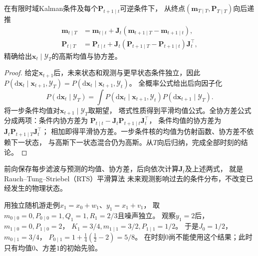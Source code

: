 \begin{theorem}[有限时域RTS平滑]
 \label{thm:dynamical-rts-smoother}
 在有限时域Kalman条件及每个$\bm P_{t+1\mid t}$可逆条件下，
 从终点$(\bm m_{T\mid T},\bm P_{T\mid T})$向后递推
 \begin{align}
  \bm m_{t\mid T}
   &=\bm m_{t\mid t}+\bm J_t(\bm m_{t+1\mid T}-\bm m_{t+1\mid t}),
       \label{eq:dynamical-rts-smoothed-mean}\\
  \bm P_{t\mid T}
   &=\bm P_{t\mid t}
         +\bm J_t(\bm P_{t+1\mid T}-\bm P_{t+1\mid t})\bm J_t^\top,
       \label{eq:dynamical-rts-smoothed-covariance}
 \end{align}
 精确给出$\bm x_t\mid\mathcal Y_T$的高斯均值与协方差。
\end{theorem}
\begin{proof}
 给定$\bm x_{t+1}$后，未来状态和观测与更早状态条件独立，因此
 $P(\mathrm d\bm x_t\mid\bm x_{t+1},\mathcal Y_T)
   =P(\mathrm d\bm x_t\mid\bm x_{t+1},\mathcal Y_t)$。
 全概率公式给出后向因子化
 \begin{equation}
  P(\mathrm d\bm x_t\mid\mathcal Y_T)
   =\int P(\mathrm d\bm x_t\mid\bm x_{t+1},\mathcal Y_t)
                   P(\mathrm d\bm x_{t+1}\mid\mathcal Y_T).
  \label{eq:dynamical-rts-backward-factorization}
 \end{equation}
 将一步条件均值对$\bm x_{t+1}\mid\mathcal Y_T$取期望，
 塔式性质得到平滑均值公式。全协方差公式分成两项：条件内协方差为
 $\bm P_{t\mid t}-\bm J_t\bm P_{t+1\mid t}\bm J_t^\top$，
 条件均值的协方差为$\bm J_t\bm P_{t+1\mid T}\bm J_t^\top$；
 相加即得平滑协方差。一步条件核的均值为仿射函数、协方差不依赖下一状态，
 与高斯下一状态混合仍为高斯。从$T$向后归纳，完成全部时刻的结论。
\end{proof}

前向保存每步滤波与预测的均值、协方差，后向依次计算$\bm J_t$及上述两式，
就是Rauch--Tung--Striebel（RTS）平滑算法
未来观测影响过去的条件分布，不改变已经发生的物理状态。

\begin{example}[未来观测降低过去状态的不确定性]
 \label{ex:dynamical-scalar-rts-update}
 用独立随机游走例$x_1=x_0+w_1$、$y_1=x_1+v_1$，
 取$m_{0\mid0}=0,P_{0\mid0}=1,Q_1=1,R_1=2/3$且噪声独立。
 观察$y_1=2$后，$m_{1\mid0}=0,P_{1\mid0}=2$，
 $K_1=3/4,m_{1\mid1}=3/2,P_{1\mid1}=1/2$。
 于是$J_0=1/2$，$m_{0\mid1}=3/4$，
 $P_{0\mid1}=1+\frac14(\frac12-2)=5/8$。
 在时刻$0$尚不能使用这个结果；此时只有均值$0$、方差$1$的初始先验。
\end{example}

